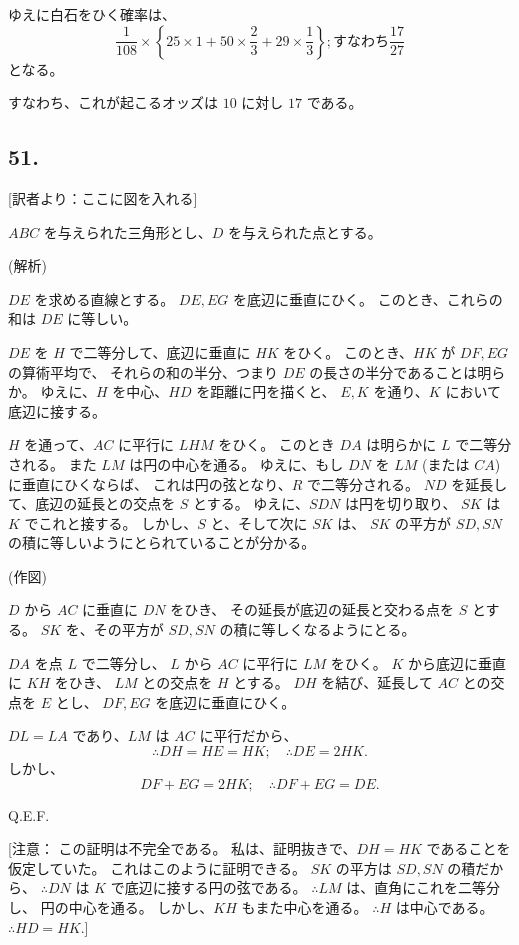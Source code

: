ゆえに白石をひく確率は、
\[
\frac{1}{108} \times
\left\{ 25 \times 1 + 50 \times \frac{2}{3} + 29 \times \frac{1}{3}
\right\}
; \mbox{すなわち} \frac{17}{27}
\]
となる。

すなわち、これが起こるオッズは $10$ に対し $17$ である。

\subsection*{51.}

[訳者より：ここに図を入れる] 

$ABC$ を与えられた三角形とし、$D$ を与えられた点とする。

(解析)

$DE$ を求める直線とする。
$DE, EG$ を底辺に垂直にひく。
このとき、これらの和は $DE$ に等しい。

$DE$ を $H$ で二等分して、底辺に垂直に $HK$ をひく。
このとき、$HK$ が $DF, EG$ の算術平均で、
それらの和の半分、つまり $DE$ の長さの半分であることは明らか。
ゆえに、$H$ を中心、$HD$ を距離に円を描くと、
$E, K$ を通り、$K$ において底辺に接する。

$H$ を通って、$AC$ に平行に $LHM$ をひく。
このとき $DA$ は明らかに $L$ で二等分される。
また $LM$ は円の中心を通る。
ゆえに、もし $DN$ を $LM$ (または $CA$)に垂直にひくならば、
これは円の弦となり、$R$ で二等分される。
$ND$ を延長して、底辺の延長との交点を $S$ とする。
ゆえに、$SDN$ は円を切り取り、
$SK$ は $K$ でこれと接する。
しかし、$S$ と、そして次に $SK$ は、
$SK$ の平方が $SD, SN$ の積に等しいようにとられていることが分かる。

(作図)

$D$ から $AC$ に垂直に $DN$ をひき、
その延長が底辺の延長と交わる点を $S$ とする。
$SK$ を、その平方が $SD, SN$ の積に等しくなるようにとる。

$DA$ を点 $L$ で二等分し、
$L$ から $AC$ に平行に $LM$ をひく。
$K$ から底辺に垂直に $KH$ をひき、
$LM$ との交点を $H$ とする。
$DH$ を結び、延長して $AC$ との交点を $E$ とし、
$DF, EG$ を底辺に垂直にひく。

$DL = LA$ であり、$LM$ は $AC$ に平行だから、
\[
\therefore
DH = HE = HK;
\quad \therefore DE = 2 HK.
\]
しかし、
\[
DF + EG = 2 HK;
\quad \therefore DF + EG = DE.
\]

Q.E.F.

[注意：
この証明は不完全である。
私は、証明抜きで、$DH = HK$ であることを仮定していた。
これはこのように証明できる。
$SK$ の平方は $SD, SN$ の積だから、
$\therefore DN$ は $K$ で底辺に接する円の弦である。
$\therefore LM$ は、直角にこれを二等分し、
円の中心を通る。
しかし、$KH$ もまた中心を通る。
$\therefore H$ は中心である。
$\therefore HD = HK$.]

